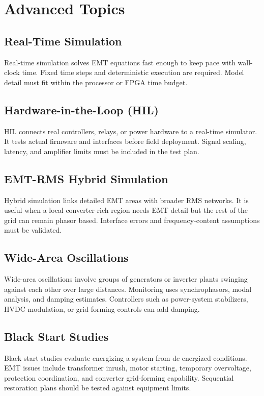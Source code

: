 \documentclass[11pt]{article}
\begin{document}
\section{Advanced Topics}
\subsection{Real-Time Simulation}
Real-time simulation solves EMT equations fast enough to keep pace with wall-clock time. Fixed time steps and deterministic execution are required. Model detail must fit within the processor or FPGA time budget.

\subsection{Hardware-in-the-Loop (HIL)}
HIL connects real controllers, relays, or power hardware to a real-time simulator. It tests actual firmware and interfaces before field deployment. Signal scaling, latency, and amplifier limits must be included in the test plan.

\subsection{EMT-RMS Hybrid Simulation}
Hybrid simulation links detailed EMT areas with broader RMS networks. It is useful when a local converter-rich region needs EMT detail but the rest of the grid can remain phasor based. Interface errors and frequency-content assumptions must be validated.

\subsection{Wide-Area Oscillations}
Wide-area oscillations involve groups of generators or inverter plants swinging against each other over large distances. Monitoring uses synchrophasors, modal analysis, and damping estimates. Controllers such as power-system stabilizers, HVDC modulation, or grid-forming controls can add damping.

\subsection{Black Start Studies}
Black start studies evaluate energizing a system from de-energized conditions. EMT issues include transformer inrush, motor starting, temporary overvoltage, protection coordination, and converter grid-forming capability. Sequential restoration plans should be tested against equipment limits.
\end{document}
